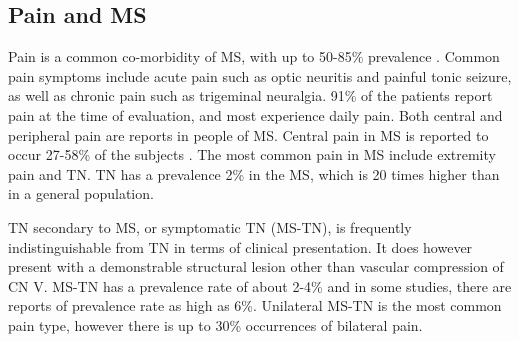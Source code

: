 \subsection{Pain and MS}
Pain is a common co-morbidity of MS, with up to 50-85\% prevalence \cite{Osterberg2005}. Common pain symptoms include acute pain such as optic neuritis and painful tonic seizure, as well as chronic pain such as trigeminal neuralgia. 91\% of the patients report pain at the time of evaluation, and most experience daily pain. Both central and peripheral pain are reports in people of MS. Central pain in MS is reported to occur 27-58\% of the subjects
\cite{OConnor2008}. The most common pain in MS include extremity pain and TN. TN has a prevalence 2\% in the MS, which is 20 times higher than in a general population.

TN secondary to MS, or symptomatic TN (MS-TN), is frequently indistinguishable from TN in terms of clinical presentation. It does however present with a demonstrable structural lesion other than vascular compression of CN V. MS-TN has a prevalence rate of about 2-4\% and in some studies, there are reports of prevalence rate as high as 6\%. Unilateral MS-TN is the most common pain type, however there is up to 30\% occurrences of bilateral pain. 

